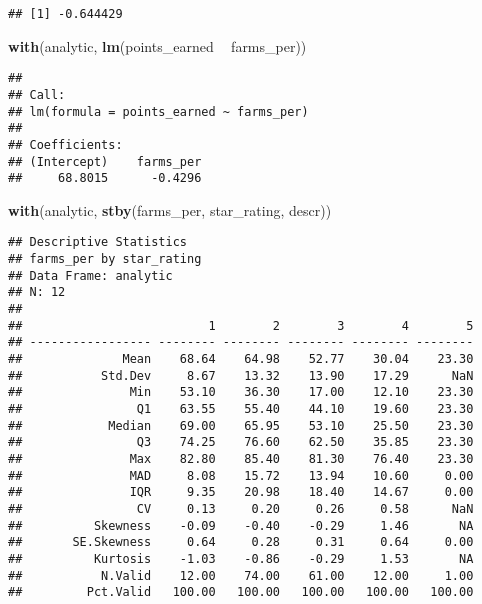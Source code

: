 \documentclass[
]{article}
\newenvironment{Shaded}{\begin{snugshade}}{\end{snugshade}}
\newcommand{\KeywordTok}[1]{\textcolor[rgb]{0.13,0.29,0.53}{\textbf{#1}}}
\newcommand{\NormalTok}[1]{#1}
\newcommand{\OperatorTok}[1]{\textcolor[rgb]{0.81,0.36,0.00}{\textbf{#1}}}
\newcommand{\StringTok}[1]{\textcolor[rgb]{0.31,0.60,0.02}{#1}}
\begin{document}
\begin{verbatim}
## [1] -0.644429
\end{verbatim}

\begin{Shaded}
\begin{Highlighting}[]
\KeywordTok{with}\NormalTok{(analytic, }\KeywordTok{lm}\NormalTok{(points_earned }\OperatorTok{~}\StringTok{ }\NormalTok{farms_per))}
\end{Highlighting}
\end{Shaded}

\begin{verbatim}
## 
## Call:
## lm(formula = points_earned ~ farms_per)
## 
## Coefficients:
## (Intercept)    farms_per  
##     68.8015      -0.4296
\end{verbatim}

\begin{Shaded}
\begin{Highlighting}[]
\KeywordTok{with}\NormalTok{(analytic, }\KeywordTok{stby}\NormalTok{(farms_per, star_rating, descr))}
\end{Highlighting}
\end{Shaded}

\begin{verbatim}
## Descriptive Statistics  
## farms_per by star_rating  
## Data Frame: analytic  
## N: 12  
## 
##                          1        2        3        4        5
## ----------------- -------- -------- -------- -------- --------
##              Mean    68.64    64.98    52.77    30.04    23.30
##           Std.Dev     8.67    13.32    13.90    17.29      NaN
##               Min    53.10    36.30    17.00    12.10    23.30
##                Q1    63.55    55.40    44.10    19.60    23.30
##            Median    69.00    65.95    53.10    25.50    23.30
##                Q3    74.25    76.60    62.50    35.85    23.30
##               Max    82.80    85.40    81.30    76.40    23.30
##               MAD     8.08    15.72    13.94    10.60     0.00
##               IQR     9.35    20.98    18.40    14.67     0.00
##                CV     0.13     0.20     0.26     0.58      NaN
##          Skewness    -0.09    -0.40    -0.29     1.46       NA
##       SE.Skewness     0.64     0.28     0.31     0.64     0.00
##          Kurtosis    -1.03    -0.86    -0.29     1.53       NA
##           N.Valid    12.00    74.00    61.00    12.00     1.00
##         Pct.Valid   100.00   100.00   100.00   100.00   100.00
\end{verbatim}
\end{document}
